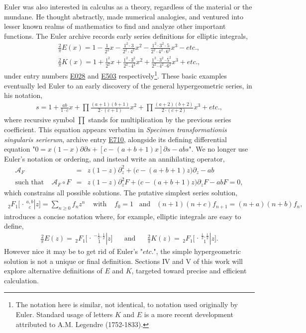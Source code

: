 \documentclass[nofootinbib,preprint]{revtex4-1}
\newcommand{\tFo}[3]{\,_2F_1 \bigg[ 
\genfrac.|{0pt}{}{#1}{#2} #3 \bigg]}
\begin{document}
Euler was also interested in calculus as a theory, regardless of the material or 
the mundane. He thought abstractly, made numerical analogies, and ventured into 
lesser known realms of mathematics to find and analyze other important functions. 
The Euler archive records early series definitions for elliptic integrals,
\begin{eqnarray}
\frac{2}{\pi}E(x) = 1 -\frac{1}{2^2}x  
-\frac{1^2 \cdot 3}{2^2 \cdot 4^2}x^2 
-\frac{1^2 \cdot 3^2 \cdot 5}{2^2 \cdot 4^2 \cdot 6^2}x^3 - etc., \nonumber \\
\frac{2}{\pi}K(x) = 1 +\frac{1^2}{2^2}x 
+\frac{1^2 \cdot 3^2}{2^2 \cdot 4^2}x^2 
+\frac{1^2 \cdot 3^2 \cdot 5^2}{2^2 \cdot 4^2 \cdot 6^2}x^3 + etc., \nonumber 
\end{eqnarray}
under entry numbers     
\href{http://eulerarchive.maa.org/pages/E028.html}{E028} and
\href{http://eulerarchive.maa.org/pages/E503.html}{E503}  respectively\footnote{The 
notation here is similar, not identical, to notation used originally by Euler. Standard
usage of letters $K$ and $E$ is a more recent development attributed to A.M. Legendre (1752-1833).}.  
These basic examples eventually led Euler to an early discovery of the general hypergeometric 
series, in his notation, 
\begin{eqnarray}
s = 1 + \frac{ab}{1\cdot c} x + \prod \frac{(a+1)(b+1)}{2\cdot(c+1)} x^2
 + \prod \frac{(a+2)(b+2)}{2\cdot(c+2)} x^3 + etc.,  \nonumber
\end{eqnarray}
where recursive symbol $\prod$ stands for multiplication by the previous series 
coefficient. This equation appears verbatim in 
\textit{Specimen transformationis singularis serierum}, 
archive entry \href{http://eulerarchive.maa.org/pages/E710.html}{E710}, alongside
its defining differential equation 
"$0=x(1-x)\partial\partial s +[c-(a+b+1)x]\partial s - a b s$". We no longer 
use Euler's notation or ordering, and instead write an annihilating operator, 
\begin{eqnarray}
\mathcal{A}_F &=& z(1-z)\partial^2_z  +\big(c-(a+b+1)z\big)\partial_z  - a b 
 \nonumber \\
\text{such that} \;\;\;\; \mathcal{A}_F \circ F &=& z(1-z)\partial^2_z F  
+\big(c-(a+b+1)z\big)\partial_z F  - a b F = 0, \nonumber
\end{eqnarray}
which constrains all possible solutions. The putative simplest series solution,
\begin{eqnarray}
\tFo{a,b}{c}{z} = \sum_{n\ge 0} f_n z^n 
\;\;\;\; \text{with} \;\;\;\; f_0=1 \;\;\;\text{and} 
\;\;\; (n+1)(n+c)f_{n+1}=(n+a)(n+b)f_n , \nonumber
\end{eqnarray}
introduces a concise notation where, for example, 
elliptic integrals are easy to define, 
\begin{eqnarray}
\frac{2}{\pi} E(z) = \tFo{-\frac{1}{2},\frac{1}{2}}{1}{z}
\;\;\;\;\;\; \text{and} \;\;\;\;\;\;
\frac{2}{\pi} K(z) = \tFo{\frac{1}{2},\frac{1}{2}}{1}{z}.  \nonumber   
\end{eqnarray}
However nice it may be to get rid of Euler's "$etc.$", the simple hypergeometric 
solution is not a unique or final definition. Sections IV and V of this work 
will explore alternative definitions of $E$ and $K$, targeted toward precise 
and efficient calculation.
\end{document}
